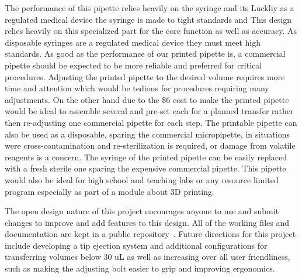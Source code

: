 \documentclass[10pt,letterpaper]{article}
\begin{document}
The performance of this pipette relies heavily on the syringe and its
Luckliy as a regulated medical device the syringe is made to tight standards and 
This design relies heavily on this specialized part for the core function as well as accuracy.
As disposable syringes are a regulated medical device they must meet high standards.
As good as the performance of our printed pipette is, a commercial pipette should be expected to be more reliable and preferred for critical procedures. 
Adjusting the printed pipette to the desired volume requires more time and attention which would be tedious for procedures requiring many adjustments.
On the other hand due to the \$6 cost to make the printed pipette would be ideal to assemble several and pre-set each for a planned transfer rather then re-adjusting one commercial pipette for each step.
The printable pipette can also be used as a disposable, sparing the commercial micropipette, in situations were cross-contamination and re-sterilization is required, or damage from volatile reagents is a concern.
The syringe of the printed pipette can be easily replaced with a fresh sterile one sparing the expensive commercial pipette.
This pipette would also be ideal for high school and teaching labs or any resource limited program especially as part of a module about 3D printing.

The open design nature of this project encourages anyone to use and submit changes to improve and add features to this design.
All of the working files and documentation are kept in a public repository~\cite{BMLmicropipette}.
Future directions for this project include developing a tip ejection system and additional configurations for transferring volumes below 30 uL as well as  increasing over all user friendliness, such as making the adjusting bolt easier to grip and improving ergonomics.
\end{document}
